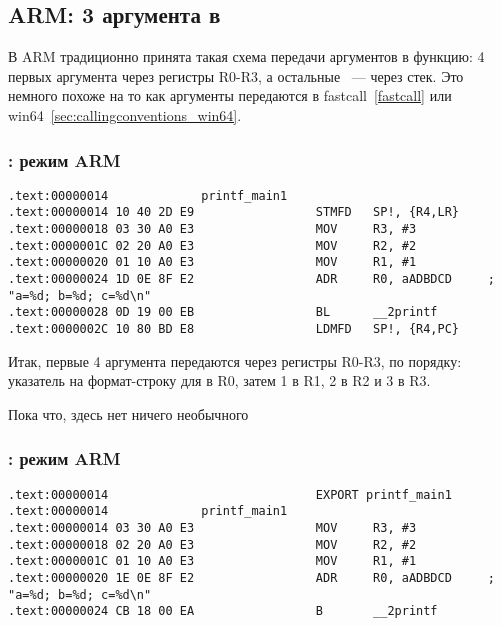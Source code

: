 ﻿%
\subsection{ARM: 3 аргумента в \printf}

В ARM традиционно принята такая схема передачи аргументов в функцию: 4 первых аргумента через регистры R0-R3,
а остальные ~--- через стек. Это немного похоже на то как аргументы передаются в fastcall~\ref{fastcall} или 
win64~\ref{sec:callingconventions_win64}.

\subsubsection{\NonOptimizingKeil: режим ARM}

\begin{lstlisting}
.text:00000014             printf_main1
.text:00000014 10 40 2D E9                 STMFD   SP!, {R4,LR}
.text:00000018 03 30 A0 E3                 MOV     R3, #3
.text:0000001C 02 20 A0 E3                 MOV     R2, #2
.text:00000020 01 10 A0 E3                 MOV     R1, #1
.text:00000024 1D 0E 8F E2                 ADR     R0, aADBDCD     ; "a=%d; b=%d; c=%d\n"
.text:00000028 0D 19 00 EB                 BL      __2printf
.text:0000002C 10 80 BD E8                 LDMFD   SP!, {R4,PC}
\end{lstlisting}

Итак, первые 4 аргумента передаются через регистры R0-R3, по порядку: указатель на формат-строку для \printf
в R0, затем 1 в R1, 2 в R2 и 3 в R3. 

Пока что, здесь нет ничего необычного

\subsubsection{\OptimizingKeil: режим ARM}
\label{ARM_B_to_printf}

\begin{lstlisting}
.text:00000014                             EXPORT printf_main1
.text:00000014             printf_main1
.text:00000014 03 30 A0 E3                 MOV     R3, #3
.text:00000018 02 20 A0 E3                 MOV     R2, #2
.text:0000001C 01 10 A0 E3                 MOV     R1, #1
.text:00000020 1E 0E 8F E2                 ADR     R0, aADBDCD     ; "a=%d; b=%d; c=%d\n"
.text:00000024 CB 18 00 EA                 B       __2printf
\end{lstlisting}

